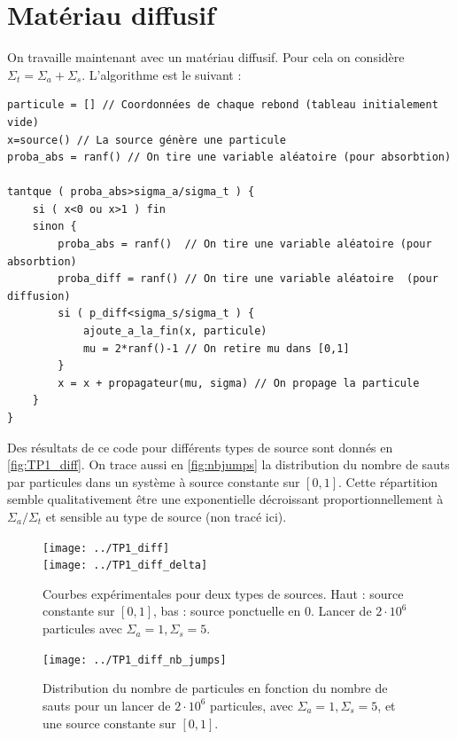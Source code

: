 \documentclass[11pt,a4paper]{article}
\begin{document}
\section{Matériau diffusif}

On travaille maintenant avec un matériau diffusif. Pour cela on considère $\Sigma_t = \Sigma_a + \Sigma_s$. L'algorithme est le suivant : 

\begin{verbatim}
particule = [] // Coordonnées de chaque rebond (tableau initialement vide) 
x=source() // La source génère une particule                                      
proba_abs = ranf() // On tire une variable aléatoire (pour absorbtion)

tantque ( proba_abs>sigma_a/sigma_t ) {
    si ( x<0 ou x>1 ) fin 
    sinon {
        proba_abs = ranf()  // On tire une variable aléatoire (pour absorbtion)
        proba_diff = ranf() // On tire une variable aléatoire  (pour diffusion)
        si ( p_diff<sigma_s/sigma_t ) {
            ajoute_a_la_fin(x, particule)
            mu = 2*ranf()-1 // On retire mu dans [0,1]
        }
        x = x + propagateur(mu, sigma) // On propage la particule
    }
}
\end{verbatim}

Des résultats de ce code pour différents types de source sont donnés en \autoref{fig:TP1_diff}. On trace aussi en \autoref{fig:nbjumps} la distribution du nombre de sauts par particules dans un système à source constante sur $[0,1]$. Cette répartition semble qualitativement être une exponentielle décroissant proportionnellement à $\Sigma_a/\Sigma_t$ et sensible au type de source (non tracé ici).
\begin{figure}
  \centering
  \texttt{[image: ../TP1\_diff]} \\
  \texttt{[image: ../TP1\_diff\_delta]}
  \caption{Courbes expérimentales pour deux types de sources. Haut : source constante sur $[0,1]$, bas : source ponctuelle en 0. Lancer de $2\cdot10^6$ particules avec $\Sigma_a = 1, \Sigma_s = 5$.}
  \label{fig:diff}
\end{figure}

\begin{figure}
  \centering
  \texttt{[image: ../TP1\_diff\_nb\_jumps]}
  \caption{Distribution du nombre de particules en fonction du nombre de sauts pour un lancer de $2\cdot10^6$ particules, avec $\Sigma_a = 1, \Sigma_s = 5$, et une source constante sur $[0,1]$.}
  \label{fig:nbjumps}
\end{figure}
\end{document}
